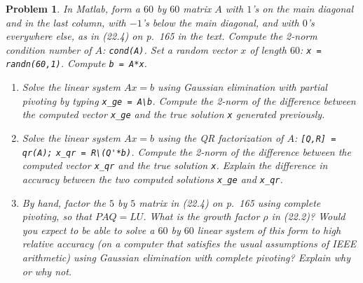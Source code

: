 \documentclass[12pt]{report}
\newtheorem{problem}{Problem}
\begin{document}
\begin{problem}
    In Matlab, form a $60$ by $60$ matrix $A$ with $1$'s on the main diagonal
and in the last column, with $-1$'s below the main diagonal, and with
$0$'s everywhere else, as in (22.4) on p.~165 in the text.  Compute
the 2-norm condition number of $A$:  \verb+cond(A)+.  Set a random
vector $x$ of length $60$:  \verb+x = randn(60,1)+.  Compute \verb+b = A*x+.
\begin{enumerate}
\item
Solve the linear system $A x = b$ using Gaussian elimination with partial
pivoting by typing \verb+x_ge = A\b+.  Compute the 2-norm of the
difference between the computed vector \verb+x_ge+ and the true solution
\verb+x+ generated previously.
\item
Solve the linear system $Ax=b$ using the QR factorization of $A$:
\verb+[Q,R] = qr(A);+ \verb+x_qr = R\(Q'*b)+.  Compute the 2-norm of the
difference between the computed vector \verb+x_qr+ and the true solution
\verb+x+.  Explain the difference in accuracy between the two computed
solutions \verb+x_ge+ and \verb+x_qr+.
\item
By hand, factor the $5$ by $5$ matrix in (22.4) on p.~165 using {\em complete}
pivoting, so that $PAQ = LU$.  What is the growth factor $\rho$ in (22.2)?
Would you expect to be able to solve a $60$ by $60$ linear system of this form
to high relative accuracy (on a computer that satisfies the usual assumptions
of IEEE arithmetic) using Gaussian elimination with complete pivoting?
Explain why or why not.
\end{enumerate}

\end{problem}
\end{document}
